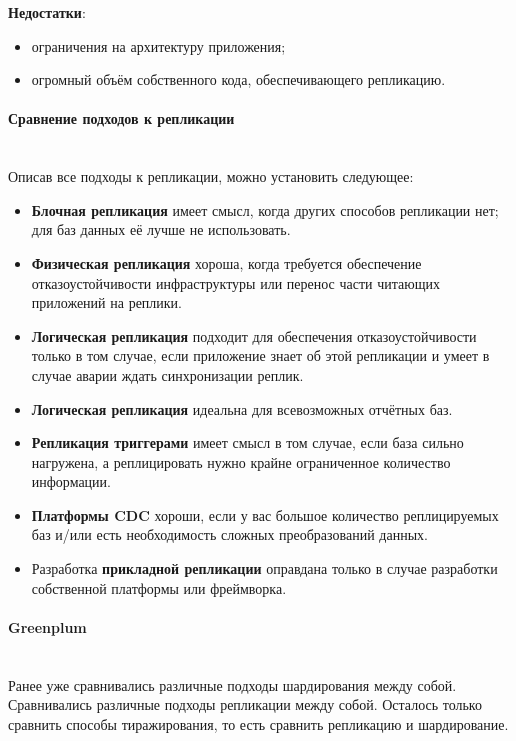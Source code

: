 \textbf{Недостатки}:
\begin{itemize}
    \item ограничения на архитектуру приложения;
    \item огромный объём собственного кода, обеспечивающего репликацию.
\end{itemize}

\paragraph{Сравнение подходов к репликации} ~\\
Описав все подходы к репликации, можно установить следующее:
\begin{itemize}
    \item \textbf{Блочная репликация} имеет смысл, когда других способов репликации нет; для баз данных её лучше не использовать.
    \item \textbf{Физическая репликация} хороша, когда требуется обеспечение отказоустойчивости инфраструктуры или перенос части читающих приложений на реплики.
    \item \textbf{Логическая репликация} подходит для обеспечения отказоустойчивости только в том случае, если приложение знает об этой репликации и умеет в случае аварии ждать синхронизации реплик.
    \item \textbf{Логическая репликация} идеальна для всевозможных отчётных баз.
    \item \textbf{Репликация триггерами} имеет смысл в том случае, если база сильно нагружена, а реплицировать нужно крайне ограниченное количество информации.
    \item \textbf{Платформы CDC} хороши, если у вас большое количество реплицируемых баз и/или есть необходимость сложных преобразований данных.
    \item Разработка \textbf{прикладной репликации} оправдана только в случае разработки собственной платформы или фреймворка.
\end{itemize} \autocite{Replication}

\paragraph{Greenplum} ~\\
Ранее уже сравнивались различные подходы шардирования между собой. Сравнивались различные подходы репликации между
собой. Осталось только сравнить способы тиражирования, то есть сравнить репликацию и шардирование.

